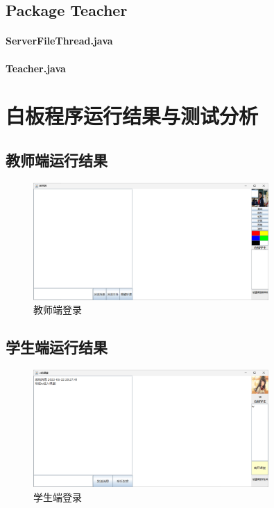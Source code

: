 \documentclass[UTF8,12pt]{article}
\begin{document}
\subsection{Package Teacher}
\paragraph{ServerFileThread.java}
\paragraph{Teacher.java}

\newpage

\section{白板程序运行结果与测试分析}
\subsection{教师端运行结果}
\begin{figure}[htbp]
    \centering
    \includegraphics[width=0.8\textwidth]{img/31.png}
    \caption{教师端登录}
\end{figure}

\subsection{学生端运行结果}
\begin{figure}[htbp]
    \centering
    \includegraphics[width=0.8\textwidth]{img/32.png}
    \caption{学生端登录}
\end{figure}
\end{document}
